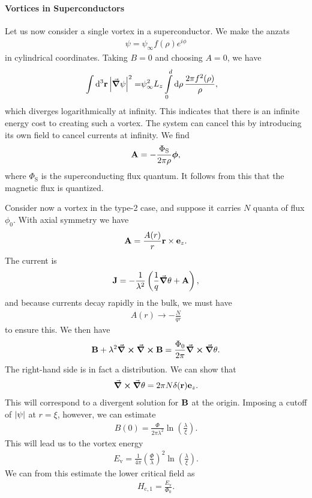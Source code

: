 \paragraph{Vortices in Superconductors}
Let us now consider a single vortex in a superconductor. We make the anzats
\begin{align*}
	\psi = \psi_{\infty}f(\rho)e^{i\phi}
\end{align*}
in cylindrical coordinates. Taking $B = 0$ and choosing $A = 0$, we have
\begin{align*}
	\int\limits_{}^{}\dd[3]{\vb{r}}\abs{\grad{\psi}}^{2} =& \psi_{\infty}^{2}L_{z}\int\limits_{0}^{d}\dd{\rho}\frac{2\pi f^{2}(\rho)}{\rho},
\end{align*}
which diverges logarithmically at infinity. This indicates that there is an infinite energy cost to creating such a vortex. The system can cancel this by introducing its own field to cancel currents at infinity. We find
\begin{align*}
	\vb{A} = -\frac{\Phi_{\text{S}}}{2\pi\rho}\vb*{\phi},
\end{align*}
where $\Phi_{\text{S}}$ is the superconducting flux quantum. It follows from this that the magnetic flux is quantized.

Consider now a vortex in the type-2 case, and suppose it carries $N$ quanta of flux $\phi_{0}$. With axial symmetry we have
\begin{align*}
	\vb{A} = \frac{A(r)}{r}\vb{r}\times\vb{e}_{z}.
\end{align*}
The current is
\begin{align*}
	\vb{J} = -\frac{1}{\lambda^{2}}\left(\frac{1}{q}\grad{\theta} + \vb{A}\right),
\end{align*}
and because currents decay rapidly in the bulk, we must have
\begin{align*}
	A(r) \to -\frac{N}{qr}
\end{align*}
to ensure this. We then have
\begin{align*}
	\vb{B} + \lambda^{2}\curl{\curl{\vb{B}}} = \frac{\Phi_{0}}{2\pi}\curl{\grad{\theta}}.
\end{align*}
The right-hand side is in fact a distribution. We can show that
\begin{align*}
	\curl{\grad{\theta}} = 2\pi N\delta(\vb{r})\vb{e}_{z}.
\end{align*}
This will correspond to a divergent solution for $\vb{B}$ at the origin. Imposing a cutoff of $\abs{\psi}$ at $r = \xi$, however, we can estimate
\begin{align*}
	B(0) = \frac{\Phi}{2\pi\lambda^{2}}\ln(\frac{\lambda}{\xi}).
\end{align*}
This will lead us to the vortex energy
\begin{align*}
	E_{\text{v}} = \frac{1}{4\pi}\left(\frac{\Phi}{\lambda}\right)^{2}\ln(\frac{\lambda}{\xi}).
\end{align*}
We can from this estimate the lower critical field as
\begin{align*}
	H_{\text{c}, 1} = \frac{E_{\text{v}}}{\Phi_{0}}.
\end{align*}

